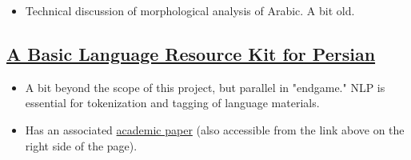 \documentclass[11pt]{article}
\begin{document}
\begin{itemize}
\item Technical discussion of morphological analysis of Arabic. A bit old.
\end{itemize}

\subsection{\href{http://www.diva-portal.org/smash/record.jsf?pid=diva2\%3A581398\&dswid=-2265}{A Basic Language Resource Kit for Persian}}
\label{sec:org4c02a32}

\begin{itemize}
\item A bit beyond the scope of this project, but parallel in "endgame." NLP is essential for tokenization and tagging of language materials.
\item Has an associated \href{http://www.diva-portal.org/smash/get/diva2:581398/FULLTEXT02.pdf}{academic paper} (also accessible from the link above on the right side of the page).
\end{itemize}
\end{document}
